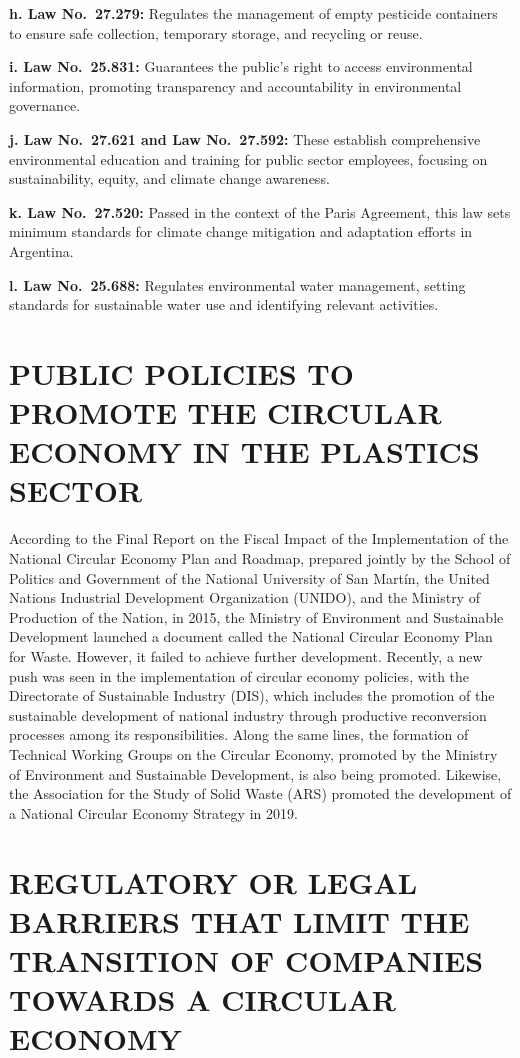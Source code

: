 \documentclass[
  12pt,
  oneside]{book}
\begin{document}
\textbf{h. Law No.~27.279:} Regulates the management of empty pesticide
containers to ensure safe collection, temporary storage, and recycling
or reuse.

\textbf{i. Law No.~25.831:} Guarantees the public's right to access
environmental information, promoting transparency and accountability in
environmental governance.

\textbf{j. Law No.~27.621 and Law No.~27.592:} These establish
comprehensive environmental education and training for public sector
employees, focusing on sustainability, equity, and climate change
awareness.

\textbf{k. Law No.~27.520:} Passed in the context of the Paris
Agreement, this law sets minimum standards for climate change mitigation
and adaptation efforts in Argentina.

\textbf{l. Law No.~25.688:} Regulates environmental water management,
setting standards for sustainable water use and identifying relevant
activities.

\section{PUBLIC POLICIES TO PROMOTE THE CIRCULAR ECONOMY IN THE PLASTICS
SECTOR}\label{public-policies-to-promote-the-circular-economy-in-the-plastics-sector}

According to the Final Report on the Fiscal Impact of the Implementation
of the National Circular Economy Plan and Roadmap, prepared jointly by
the School of Politics and Government of the National University of San
Martín, the United Nations Industrial Development Organization (UNIDO),
and the Ministry of Production of the Nation, in 2015, the Ministry of
Environment and Sustainable Development launched a document called the
National Circular Economy Plan for Waste. However, it failed to achieve
further development. Recently, a new push was seen in the implementation
of circular economy policies, with the Directorate of Sustainable
Industry (DIS), which includes the promotion of the sustainable
development of national industry through productive reconversion
processes among its responsibilities. Along the same lines, the
formation of Technical Working Groups on the Circular Economy, promoted
by the Ministry of Environment and Sustainable Development, is also
being promoted. Likewise, the Association for the Study of Solid Waste
(ARS) promoted the development of a National Circular Economy Strategy
in 2019.

\section{REGULATORY OR LEGAL BARRIERS THAT LIMIT THE TRANSITION OF
COMPANIES TOWARDS A CIRCULAR
ECONOMY}\label{regulatory-or-legal-barriers-that-limit-the-transition-of-companies-towards-a-circular-economy}
\end{document}
